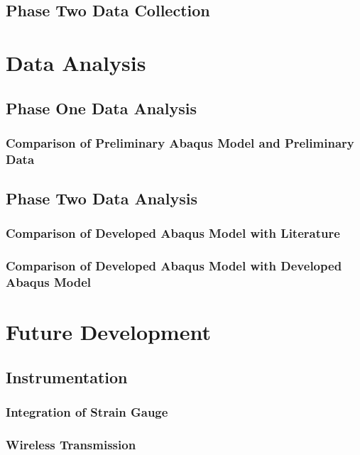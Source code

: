 \documentclass[12pt]{report}
\begin{document}
	\section{Phase Two Data Collection}
			
			
			
			
			
		
\chapter{Data Analysis}
\label{ch:DataAnalysis}
	\section{Phase One Data Analysis}
		\subsection{Comparison of Preliminary Abaqus Model and Preliminary Data}
			
	\section{Phase Two Data Analysis}
		\subsection{Comparison of Developed Abaqus Model with Literature}
			
		\subsection{Comparison of Developed Abaqus Model with Developed Abaqus Model}	
		
\chapter{Future Development}
\label{ch:FutureDevelopment}
	\section{Instrumentation}
		\subsection{Integration of Strain Gauge}
			
		\subsection{Wireless Transmission}
			\label{sec:XBeeFuture}
\end{document}
